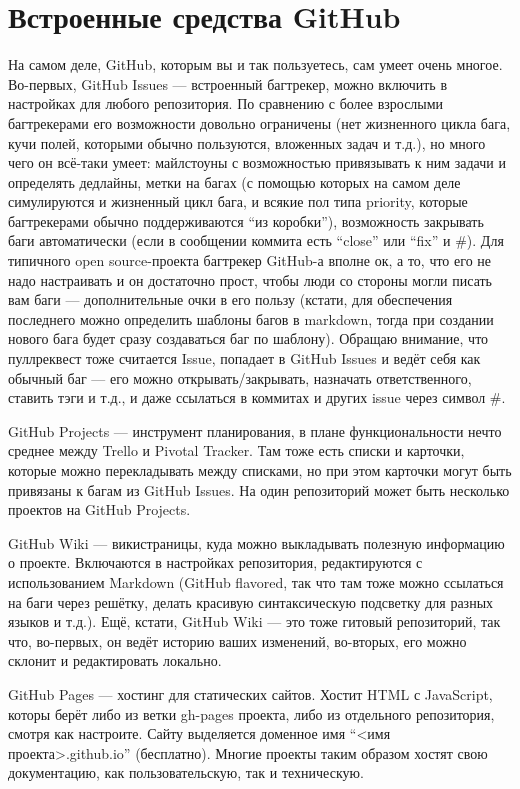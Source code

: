\documentclass[a5paper]{article}
\begin{document}
\section{Встроенные средства GitHub}

На самом деле, GitHub, которым вы и так пользуетесь, сам умеет очень многое. Во-первых, GitHub Issues --- встроенный багтрекер, можно включить в настройках для любого репозитория. По сравнению с более взрослыми багтрекерами его возможности довольно ограничены (нет жизненного цикла бага, кучи полей, которыми обычно пользуются, вложенных задач и т.д.), но много чего он всё-таки умеет: майлстоуны с возможностью привязывать к ним задачи и определять дедлайны, метки на багах (с помощью которых на самом деле симулируются и жизненный цикл бага, и всякие пол типа priority, которые багтрекерами обычно поддерживаются ``из коробки''),  возможность закрывать баги автоматически (если в сообщении коммита есть ``close'' или ``fix'' и \#<номер бага>). Для типичного open source-проекта багтрекер GitHub-а вполне ок, а то, что его не надо настраивать и он достаточно прост, чтобы люди со стороны могли писать вам баги --- дополнительные очки в его пользу (кстати, для обеспечения последнего можно определить шаблоны багов в markdown, тогда при создании нового бага будет сразу создаваться баг по шаблону). Обращаю внимание, что пуллреквест тоже считается Issue, попадает в GitHub Issues и ведёт себя как обычный баг --- его можно открывать/закрывать, назначать ответственного, ставить тэги и т.д., и даже ссылаться в коммитах и других issue через символ \#.

GitHub Projects --- инструмент планирования, в плане функциональности нечто среднее между Trello и Pivotal Tracker. Там тоже есть списки и карточки, которые можно перекладывать между списками, но при этом карточки могут быть привязаны к багам из GitHub Issues. На один репозиторий может быть несколько проектов на GitHub Projects.

GitHub Wiki --- викистраницы, куда можно выкладывать полезную информацию о проекте. Включаются в настройках репозитория, редактируются с использованием Markdown (GitHub flavored, так что там тоже можно ссылаться на баги через решётку, делать красивую синтаксическую подсветку для разных языков и т.д.). Ещё, кстати, GitHub Wiki --- это тоже гитовый репозиторий, так что, во-первых, он ведёт историю ваших изменений, во-вторых, его можно склонит и редактировать локально.

GitHub Pages --- хостинг для статических сайтов. Хостит HTML с JavaScript, которы берёт либо из ветки gh-pages проекта, либо из отдельного репозитория, смотря как настроите. Сайту выделяется доменное имя ``<имя проекта>.github.io'' (бесплатно). Многие проекты таким образом хостят свою документацию, как пользовательскую, так и техническую. 
\end{document}

